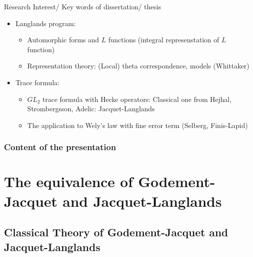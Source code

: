\documentclass[aspectratio=169]{beamer}
\theoremstyle{plain}
\theoremstyle{definition}
\theoremstyle{remark}
\begin{document}
\begin{frame}{Research Interest/ Key words of dissertation/ thesis}
    \begin{itemize}
        \item Langlands program:
        \begin{itemize}
            \item Automorphic forms and $L$ functions (integral represenstation of $L$ function)
            \item Representation theory: (Local) theta correspondence, models (Whittaker) 
        \end{itemize}
        \item Trace formula:
        \begin{itemize}
            \item $GL_{2}$ trace formula with Hecke operators: Classical one from Hejhal, Strombergsson, Adelic: Jacquet-Langlands
            \item The application to Wely's law with fine error term (Selberg, Finis-Lapid)
        \end{itemize}
    \end{itemize}
\end{frame}

\begin{frame}
\frametitle{Content of the presentation}
\tableofcontents
\end{frame}


\section{The equivalence of Godement-Jacquet and Jacquet-Langlands }
\subsection{Classical Theory of Godement-Jacquet and Jacquet-Langlands}
\end{document}
